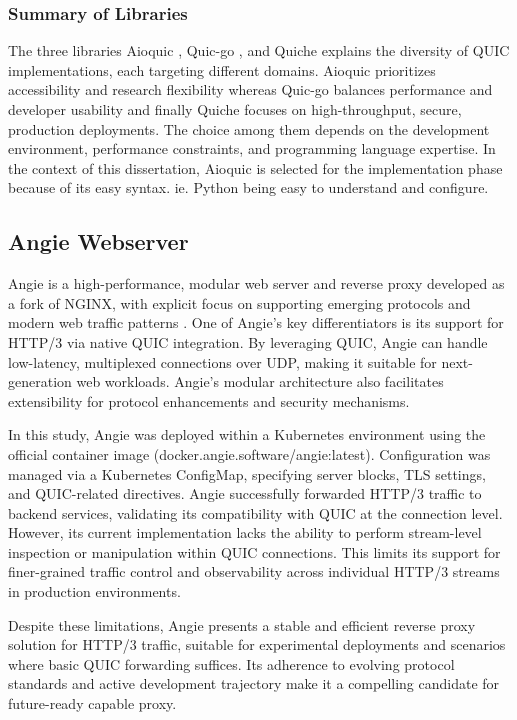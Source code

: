 \subsubsection{Summary of Libraries}
The three libraries Aioquic \cite{aioquic-repo}, Quic-go \cite{quic-go-repo}, and Quiche \cite{quiche-repo} explains the diversity of QUIC implementations, each targeting different domains. Aioquic prioritizes accessibility and research flexibility whereas Quic-go balances performance and developer usability and finally Quiche focuses on high-throughput, secure, production deployments. The choice among them depends on the development environment, performance constraints, and programming language expertise. In the context of this dissertation, Aioquic is selected for the implementation phase because of its easy syntax.  ie. Python being easy to understand and configure.

\subsection{Angie Webserver}
Angie is a high-performance, modular web server and reverse proxy developed as a fork of NGINX, with explicit focus on supporting emerging protocols and modern web traffic patterns \cite{angie-docs}. One of Angie's key differentiators is its support for HTTP/3 via native QUIC integration. By leveraging QUIC, Angie can handle low-latency, multiplexed connections over UDP, making it suitable for next-generation web workloads. Angie's modular architecture also facilitates extensibility for protocol enhancements and security mechanisms.

In this study, Angie was deployed within a Kubernetes environment using the official container image (docker.angie.software/angie:latest). Configuration was managed via a Kubernetes ConfigMap, specifying server blocks, TLS settings, and QUIC-related directives. Angie successfully forwarded HTTP/3 traffic to backend services, validating its compatibility with QUIC at the connection level. However, its current implementation lacks the ability to perform stream-level inspection or manipulation within QUIC connections. This limits its support for finer-grained traffic control and observability across individual HTTP/3 streams in production environments.

Despite these limitations, Angie presents a stable and efficient reverse proxy solution for HTTP/3 traffic, suitable for experimental deployments and scenarios where basic QUIC forwarding suffices. Its adherence to evolving protocol standards and active development trajectory make it a compelling candidate for future-ready capable proxy.

